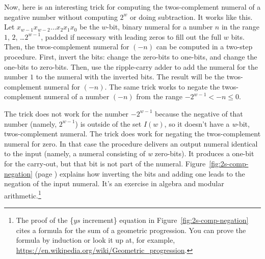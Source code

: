 Now, here is an 
interesting
trick
for computing the twos-complement numeral of a negative number without
computing $2^w$ or doing subtraction.
It works like this.
Let $x_{w-1}x_{w-2} \dots x_2x_1x_0$
be the $w$-bit, binary numeral for a number $n$ in the range $1$, $2$, \dots $2^{w-1}$,
padded if necessary with leading zeros to fill out the full $w$ bits.
Then, the twos-complement numeral for $(-n)$ can be computed
in a two-step procedure.
First, invert the bits: change the zero-bits to one-bits,
and change the one-bits to zero-bits.
Then, use the ripple-carry adder to add the numeral for the number $1$
to the numeral with the inverted bits.
The result will be the twos-complement numeral for $(-n)$.
The same trick works to negate the twos-complement numeral
of a number $(-n)$ from the range $-2^{w-1} < -n \leq 0$.

The trick does not work for the number $-2^{w-1}$
because the negative of that number (namely, $2^{w-1}$)
is outside of the set $I(w)$,
so it doesn't have a \emph{w}-bit, twos-complement numeral.
The trick does work for negating the twos-complement numeral for zero.
In that case the procedure delivers an output numeral identical
to the input (namely, a numeral consisting of \emph{w} zero-bits).
It produces a one-bit for the carry-out, but that bit is not part of the numeral.
Figure~\ref{fig:2s-comp-negation}
(page \pageref{fig:2s-comp-negation})
explains how inverting the bits and adding one leads to the negation
of the input numeral.
It's an exercise in algebra and modular arithmetic.\footnote{The
proof of the \{$ys$ increment\} equation
in Figure~\ref{fig:2s-comp-negation}
cites a formula for the sum of a geometric progression.
You can prove the formula by induction or look it up at, for example,
\url{https://en.wikipedia.org/wiki/Geometric_progression}.}

